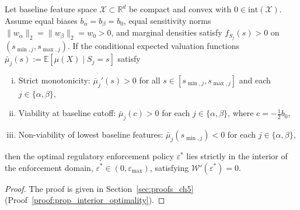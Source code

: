 \begin{proposition}
\label{prop:interior_optimality}
Let baseline feature space $\mathcal{X} \subset \mathbb{R}^d$ be compact and convex with $0 \in \mathrm{int}(\mathcal{X})$. Assume equal biases $b_\alpha = b_\beta = b_0$, equal sensitivity norms $\|w_\alpha\|_2 = \|w_\beta\|_2 = w_0 > 0$, and marginal densities satisfy $f_{S_j}(s) > 0$ on $(s_{\min, j}, s_{\max, j})$. If the conditional expected valuation functions $\bar{\mu}_j(s) := \mathbb{E}[\mu(X) \mid S_j = s]$ satisfy
\begin{enumerate}[(i)]
    \item Strict monotonicity: $\bar{\mu}_j'(s) > 0$ for all $s \in [s_{\min, j}, s_{\max, j}]$ and each $j \in \{\alpha, \beta\}$,
    \item Viability at baseline cutoff: $\bar{\mu}_j(c) > 0$ for each $j \in \{\alpha, \beta\}$, where $c = -\frac{1}{2}b_0$,
    \item Non-viability of lowest baseline features: $\bar{\mu}_j(s_{\min, j}) < 0$ for each $j \in \{\alpha, \beta\}$,
\end{enumerate}
then the optimal regulatory enforcement policy $\varepsilon^*$ lies strictly in the interior of the enforcement domain, $\varepsilon^* \in (0, \varepsilon_{\max})$, satisfying $\mathcal{W}'(\varepsilon^*) = 0$.
\end{proposition}
\begin{proof} The proof is given in Section~\ref{sec:proofs_ch5} (Proof~\ref{proof:prop_interior_optimality}).
\end{proof}

